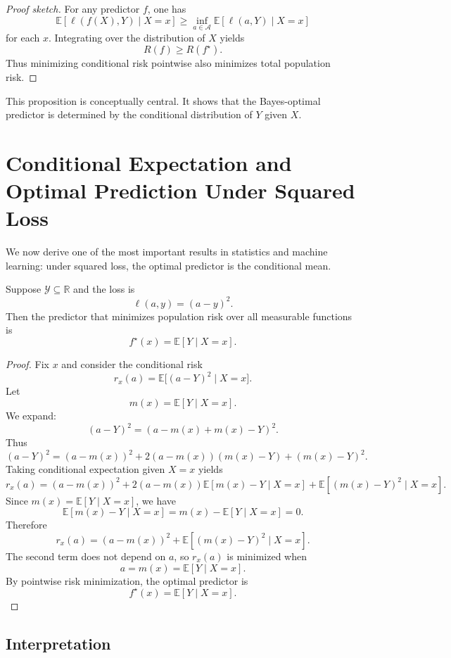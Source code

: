 \begin{proof}[Proof sketch]
For any predictor $f$, one has
\[
\mathbb{E}[\ell(f(X),Y)\mid X=x] \ge \inf_{a\in\mathcal{A}} \mathbb{E}[\ell(a,Y)\mid X=x]
\]
for each $x$. Integrating over the distribution of $X$ yields
\[
R(f)\ge R(f^\star).
\]
Thus minimizing conditional risk pointwise also minimizes total population risk.
\end{proof}

This proposition is conceptually central. It shows that the Bayes-optimal predictor is determined by the conditional distribution of $Y$ given $X$.

\section{Conditional Expectation and Optimal Prediction Under Squared Loss}

We now derive one of the most important results in statistics and machine learning: under squared loss, the optimal predictor is the conditional mean.

\begin{theorem}
Suppose $\mathcal{Y}\subseteq \mathbb{R}$ and the loss is
\[
\ell(a,y)=(a-y)^2.
\]
Then the predictor that minimizes population risk over all measurable functions is
\[
f^\star(x)=\mathbb{E}[Y\mid X=x].
\]
\end{theorem}

\begin{proof}
Fix $x$ and consider the conditional risk
\[
r_x(a)=\mathbb{E}\big[(a-Y)^2\mid X=x\big].
\]
Let
\[
m(x)=\mathbb{E}[Y\mid X=x].
\]
We expand:
\[
(a-Y)^2 = (a-m(x)+m(x)-Y)^2.
\]
Thus
\[
(a-Y)^2 = (a-m(x))^2 + 2(a-m(x))(m(x)-Y) + (m(x)-Y)^2.
\]
Taking conditional expectation given $X=x$ yields
\[
r_x(a)
= (a-m(x))^2 + 2(a-m(x))\mathbb{E}[m(x)-Y\mid X=x]
+ \mathbb{E}[(m(x)-Y)^2\mid X=x].
\]
Since $m(x)=\mathbb{E}[Y\mid X=x]$, we have
\[
\mathbb{E}[m(x)-Y\mid X=x]=m(x)-\mathbb{E}[Y\mid X=x]=0.
\]
Therefore
\[
r_x(a)
= (a-m(x))^2 + \mathbb{E}[(m(x)-Y)^2\mid X=x].
\]
The second term does not depend on $a$, so $r_x(a)$ is minimized when
\[
a=m(x)=\mathbb{E}[Y\mid X=x].
\]
By pointwise risk minimization, the optimal predictor is
\[
f^\star(x)=\mathbb{E}[Y\mid X=x].
\]
\end{proof}

\subsection{Interpretation}

